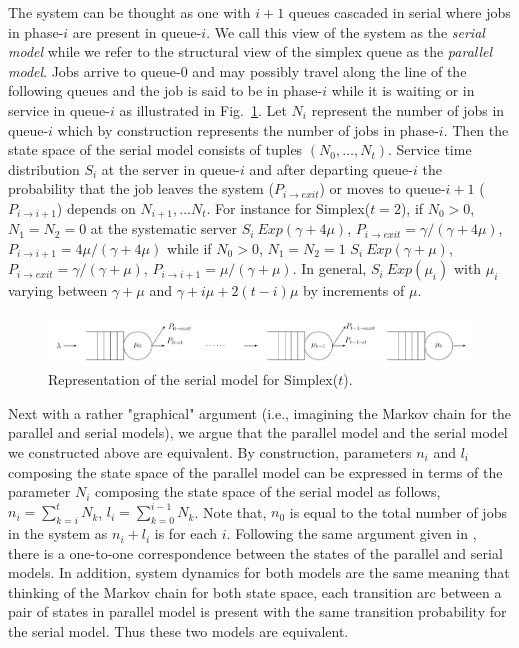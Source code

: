\documentclass[sigconf,draft]{acmart}
\begin{document}
The system can be thought as one with $i+1$ queues cascaded in serial where jobs in phase-$i$ are present in queue-$i$. We call this view of the system as the \emph{serial model} while we refer to the structural view of the simplex queue as the \emph{parallel model}. Jobs arrive to queue-$0$ and may possibly travel along the line of the following queues and the job is said to be in phase-$i$ while it is waiting or in service in queue-$i$ as illustrated in Fig.~\ref{fig:fig_simplex_t_serial_model}. Let $N_i$ represent the number of jobs in queue-$i$ which by construction represents the number of jobs in phase-$i$. Then the state space of the serial model consists of tuples $(N_0, \ldots, N_t)$. Service time distribution $S_i$ at the server in queue-$i$ and after departing queue-$i$ the probability that the job leaves the system ($P_{i \rightarrow exit}$) or moves to queue-$i+1$ ($P_{i \rightarrow i+1}$) depends on $N_{i+1}, \ldots N_t$. For instance for Simplex($t=2$), if $N_0 > 0$, $N_1 = N_2 = 0$ at the systematic server $S_i ~ Exp(\gamma+4\mu)$, $P_{i \rightarrow exit} = \gamma/(\gamma+4\mu)$, $P_{i \rightarrow i+1} = 4\mu/(\gamma+4\mu)$ while if $N_0 > 0$, $N_1 = N_2 = 1$ $S_i ~ Exp(\gamma+\mu)$, $P_{i \rightarrow exit} = \gamma/(\gamma+\mu)$, $P_{i \rightarrow i+1} = \mu/(\gamma+\mu)$. In general, $S_i ~ Exp(\mu_i)$ with $\mu_i$ varying between $\gamma+\mu$ and $\gamma + i\mu + 2(t-i)\mu$ by increments of $\mu$.
\begin{figure}[h]
  \centering
  \includegraphics[scale=0.75]{fig_simplex_t_serial_model}
  \caption{Representation of the serial model for Simplex($t$).}
  \label{fig:fig_simplex_t_serial_model}
\end{figure}

Next with a rather "graphical" argument (i.e., imagining the Markov chain for the parallel and serial models), we argue that the parallel model and the serial model we constructed above are equivalent. By construction, parameters $n_i$ and $l_i$ composing the state space of the parallel model can be expressed in terms of the parameter $N_i$ composing the state space of the serial model as follows, $n_i = \sum_{k=i}^{t} N_k$, $l_i = \sum_{k=0}^{i-1} N_k$. Note that, $n_0$ is equal to the total number of jobs in the system as $n_i + l_i$ is for each $i$. Following the same argument given in \cite{varki2001response}, there is a one-to-one correspondence between the states of the parallel and serial models. In addition, system dynamics for both models are the same meaning that thinking of the Markov chain for both state space, each transition arc between a pair of states in parallel model is present with the same transition probability for the serial model. Thus these two models are equivalent.
\end{document}
